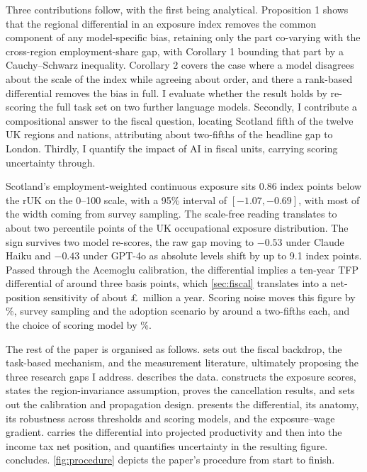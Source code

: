 Three contributions follow, with the first being analytical. Proposition 1 shows that the regional differential in an exposure index removes the common component of any model-specific bias, retaining only the part co-varying with the cross-region employment-share gap, with Corollary 1 bounding that part by a Cauchy--Schwarz inequality. Corollary 2 covers the case where a model disagrees about the scale of the index while agreeing about order, and there a rank-based differential removes the bias in full. I evaluate whether the result holds by re-scoring the full task set on two further language models. Secondly, I contribute a compositional answer to the fiscal question, locating Scotland fifth of the twelve UK regions and nations, attributing about two-fifths of the headline gap to London. Thirdly, I quantify the impact of AI in fiscal units, carrying scoring uncertainty through. 


Scotland's employment-weighted continuous exposure sits 0.86 index points below the rUK on the 0--100 scale, with a 95\% interval of $[-1.07, -0.69]$, with most of the width coming from survey sampling. The scale-free reading translates to about two percentile points of the UK occupational exposure distribution. The sign survives two model re-scores, the raw gap moving to $-0.53$ under Claude Haiku and $-0.43$ under GPT-4o as absolute levels shift by up to 9.1 index points.
Passed through the Acemoglu calibration, the differential implies a ten-year TFP differential of around three basis points, which \cref{sec:fiscal} translates into a net-position sensitivity of about \pounds\fiscCen~million a year. Scoring noise moves this figure by \fiscNoisePct\%, survey sampling and the adoption scenario by around a two-fifths each, and the choice of scoring model by \fiscModelPct\%.

The rest of the paper is organised as follows.  sets out the fiscal backdrop, the task-based mechanism, and the measurement literature, ultimately proposing the three research gaps I address.  describes the data.  constructs the exposure scores, states the region-invariance assumption, proves the cancellation results, and sets out the calibration and propagation design.  presents the differential, its anatomy, its robustness across thresholds and scoring models, and the exposure--wage gradient.  carries the differential into projected productivity and then into the income tax net position, and quantifies uncertainty in the resulting figure.  concludes. \cref{fig:procedure} depicts the paper's procedure from start to finish. 